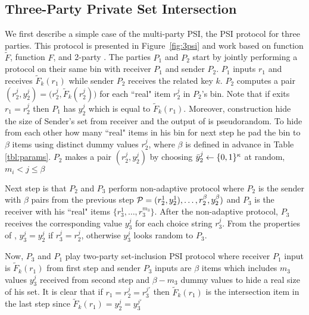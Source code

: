 \subsection{Three-Party Private Set Intersection}
\label{sect:3psi-construction}
We first describe a simple case of the multi-party PSI, the PSI protocol for three parties. This protocol is presented in Figure~\ref{fig:3psi} and work based on \batchOPRF function $\widetilde F$, \OPPRF function $F$, and 2-party \PSI. The parties $P_1$ and $P_2$ start by jointly performing a \batchOPRF protocol on their same bin with receiver $P_1$ and sender $P_2$. $P_1$ inputs $r_1$ and receives $\widetilde F_{k}(r_1)$ while sender $P_2$ receives the related key $k$. $P_2$ computes a pair $(r^{j}_2, y^{j}_2) =\big(r^{j}_2,\widetilde F_{k}(r^{j}_2)\big)$ for each ``real" item  $r^{j}_2$ in $P_2$'s bin. Note that if exits $r_1=r^{j}_2$ then $P_1$ has $y^{j}_2$ which is equal to  $\widetilde F_{k}(r_1)$. Moreover, \batchOPRF construction hide the size of Sender's set from receiver and the output of \batchOPRF is pseudorandom. To hide from each other how many ``real" items in his bin for next step he pad the bin to $\beta$ items using distinct dummy values ${r}^j_2$, where $\beta$ is defined in advance in Table \ref{tbl:params}. $P_2$ makes a pair $({r}^j_2, {y}^{j}_2)$ by choosing  $\bar{y}^j_2 \from\bool^\kappa$ at random, $ m_i<j\leq \beta $

Next step is that $P_2$ and $P_3$ perform non-adaptive \OPPRF protocol where $P_2$ is the sender with $\beta$ pairs from the previous step $\P={(r^1_2,y^1_2),\ldots,{r}^{\beta}_2,{y}^{\beta}_2) }$ and $P_3$ is the receiver with his ``real" items $\{r^{1}_3, \ldots, r^{m_3}_3\}$. After the non-adaptive \OPPRF protocol, $P_3$ receives the corresponding value $y^j_3$ for each choice string $r^j_3$. From the properties of \OPPRF, $y^j_3=y^j_2$ if $r^j_3=r^j_2$, otherwise $y^j_3$ looks random to $P_3$. 

Now, $P_3$ and $P_1$ play two-party set-inclusion PSI protocol where receiver $P_1$ input is $\widetilde F_{k}(r_1)$ from first step and sender $P_3$ inputs are $\beta$ items which includes $m_3$ values $y^j_3$ received from second step and $\beta-m_3$ dummy values to hide a real size of his set. It is clear that if $r_1=r^j_2=r^{j'}_3$ then $\widetilde F_{k}(r_1)$ is the intersection item in the last step since $\widetilde F_{k}(r_1)=y^j_2=y^{j'}_3$

